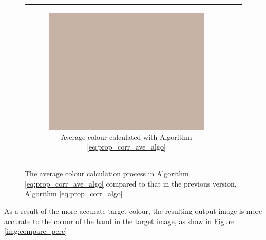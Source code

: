 \begin{figure}[H]
\begin{tabular}{ccc}
\begin{subfigure}[b]{0.30\textwidth}
        \includegraphics[width=\textwidth]{images/ave_col_10}
        \caption{Average colour calculated with Algorithm \ref{eq:prop_corr_ave_algo}}\label{img:ave_col_10}
    \end{subfigure}
\end{tabular}
\caption{The average colour calculation process in Algorithm \ref{eq:prop_corr_ave_algo} compared to that in the previous version, Algorithm \ref{eq:prop_corr_algo}}\label{img:10_perc_mask}
\end{figure}

As a result of the more accurate target colour, the resulting output image is more accurate to the colour of the hand in the target image, as show in Figure \ref{img:compare_perc}

